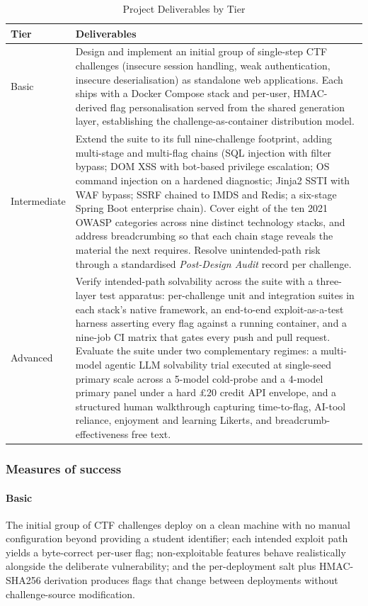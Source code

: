 \begin{table}[h]
\centering
\caption{Project Deliverables by Tier}
\label{tab:deliverables}
\begin{tabular}{|p{1.5cm}|p{6.2cm}|}
\hline
\textbf{Tier} & \textbf{Deliverables} \\ \hline
Basic &
Design and implement an initial group of single-step CTF challenges
(insecure session handling, weak authentication, insecure
deserialisation) as standalone web applications. Each ships with a
Docker Compose stack and per-user, HMAC-derived flag personalisation
served from the shared generation layer, establishing the
challenge-as-container distribution model. \\ \hline
Intermediate &
Extend the suite to its full nine-challenge footprint, adding
multi-stage and multi-flag chains (SQL injection with filter
bypass; DOM XSS with bot-based privilege escalation; OS command
injection on a hardened diagnostic; Jinja2 SSTI with WAF bypass;
SSRF chained to IMDS and Redis; a six-stage Spring Boot enterprise
chain). Cover eight of the ten 2021 OWASP categories across nine
distinct technology stacks, and address breadcrumbing so that each
chain stage reveals the material the next requires. Resolve
unintended-path risk through a standardised \textit{Post-Design
Audit} record per challenge. \\ \hline
Advanced &
Verify intended-path solvability across the suite with a
three-layer test apparatus: per-challenge unit and integration
suites in each stack's native framework, an end-to-end
exploit-as-a-test harness asserting every flag against a running
container, and a nine-job CI matrix that gates every push and pull
request. Evaluate the suite under two complementary regimes: a
multi-model agentic LLM solvability trial executed at
single-seed primary scale across a 5-model cold-probe and a
4-model primary panel under a hard \pounds20 credit API envelope, and
a structured human walkthrough capturing time-to-flag, AI-tool
reliance, enjoyment and learning Likerts, and breadcrumb-effectiveness free text. \\ \hline
\end{tabular}
\end{table}

\subsubsection{Measures of success}

\paragraph{\textbf{Basic}} The initial group of CTF challenges deploy
on a clean machine with no manual configuration beyond providing a
student identifier; each intended exploit path yields a byte-correct
per-user flag; non-exploitable features behave realistically
alongside the deliberate vulnerability; and the per-deployment salt
plus HMAC-SHA256 derivation produces flags that change between
deployments without challenge-source modification.

